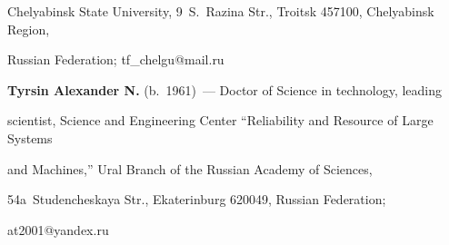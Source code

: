 Chelyabinsk State University, 9~S.~Razina Str., Troitsk 457100, Chelyabinsk Region, 

Russian Federation; \mbox{tf\_chelgu@mail.ru}



\vspace*{3pt}



\noindent

\textbf{Tyrsin Alexander N.} (b.\ 1961)~--- Doctor of Science in technology, leading 

scientist, Science and Engineering Center ``Reliability and Resource of Large Systems 

and Machines,'' Ural Branch of the Russian Academy of Sciences, 

54a~Studencheskaya Str., Ekaterinburg 620049, Russian Federation; 

\mbox{at2001@yandex.ru}



\label{end\stat}



\renewcommand{\bibname}{\protect\rm Литература} 

